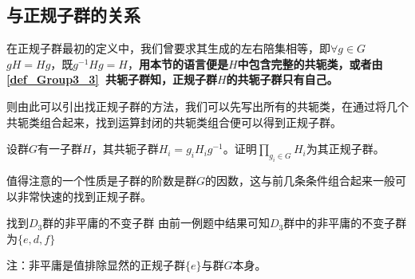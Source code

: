 \subsection{与正规子群的关系}
在正规子群最初的定义中，我们曾要求其生成的左右陪集相等，即$\forall g \in G$ \\
$gH=Hg$，既$g^{-1}Hg=H$，\textbf{用本节的语言便是$H$中包含完整的共轭类，或者由\autoref{def_Group3_3}~共轭子群知，正规子群$H$的共轭子群只有自己。}

则由此可以引出找正规子群的方法，我们可以先写出所有的共轭类，在通过将几个共轭类组合起来，找到运算封闭的共轭类组合便可以得到正规子群。

\begin{exercise}{}
设群$G$有一子群$H$，其共轭子群$H_i=g_iH_ig^{-1}$。证明$\prod_{g_i\in G}H_i$为其正规子群。
\end{exercise}
值得注意的一个性质是子群的阶数是群$G$的因数，这与前几条条件组合起来一般可以非常快速的找到正规子群。

\begin{example}{找到$D_3$群的非平庸的不变子群}
由前一例题中结果可知$D_3$群中的非平庸的不变子群为$\{e,d,f\}$

注：非平庸是值排除显然的正规子群$\{e\}$与群$G$本身。
\end{example}
